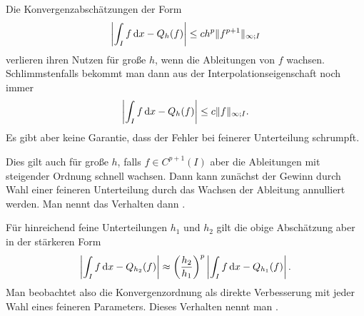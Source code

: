 \begin{remark}
  Die Konvergenzabschätzungen der Form
  \begin{gather}
    \left|\int_I f\,\mathrm{d} x - Q_h(f)\right| \le c h^p \lVert f^{p+1}\rVert_{\infty;I}
  \end{gather}
  verlieren ihren Nutzen für große $h$, wenn die Ableitungen von $f$
  wachsen. Schlimmstenfalls bekommt man dann aus der
  Interpolationseigenschaft noch immer
  \begin{gather}
    \left|\int_I f\,\mathrm{d} x - Q_h(f)\right| \le c \lVert f\rVert_{\infty;I}.
  \end{gather}
  Es gibt aber keine Garantie, dass der Fehler bei feinerer
  Unterteilung schrumpft.

  Dies gilt auch für große $h$, falls $f\in C^{p+1}(I)$ aber die
  Ableitungen mit steigender Ordnung schnell wachsen. Dann kann
  zunächst der Gewinn durch Wahl einer feineren Unterteilung durch das
  Wachsen der Ableitung annulliert werden. Man nennt das Verhalten
  dann .

Für hinreichend feine Unterteilungen $h_1$ und $h_2$ gilt die obige
Abschätzung aber in der stärkeren Form
  \begin{gather}
    \left|\int_I f\,\mathrm{d} x - Q_{h_2}(f)\right|
    \approx \left(\frac{h_2}{h_1}\right)^p
    \left|\int_I f\,\mathrm{d} x - Q_{h_1}(f)\right|.
  \end{gather}
  Man beobachtet also die Konvergenzordnung als direkte Verbesserung
  mit jeder Wahl eines feineren Parameters. Dieses Verhalten nennt man
  .
\end{remark}

